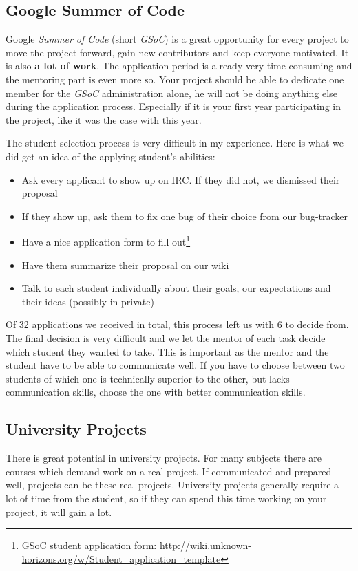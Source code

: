 \subsection{Google Summer of Code}
Google \textit{Summer of Code} (short \textit{GSoC}) is a great opportunity for every \OS{} project to move the project
forward, gain new contributors and keep everyone motivated. It is also \textbf{a lot of work}. The application period is
already very time consuming and the mentoring part is even more so. Your project should be able to dedicate one member
for the \textit{GSoC} administration alone, he will not be doing anything else during the application process. Especially
if it is your first year participating in the project, like it was the case with \UH{} this year.

The student selection process is very difficult in my experience. Here is what we did get an idea of the applying student's
abilities:
\begin{itemize}
    \item Ask every applicant to show up on IRC. If they did not, we dismissed their proposal
    \item If they show up, ask them to fix one bug of their choice from our bug-tracker
    \item Have a nice application form to fill out\footnote{\UH{} GSoC student application form:
        \url{http://wiki.unknown-horizons.org/w/Student_application_template}}
    \item Have them summarize their proposal on our wiki
    \item Talk to each student individually about their goals, our expectations and their ideas (possibly in private)
\end{itemize}

Of 32 applications we received in total, this process left us with 6 to decide from. The final decision is very difficult
and we let the mentor of each task decide which student they wanted to take. This is important as the mentor and the
student have to be able to
communicate well. If you have to choose between two students of which one is technically superior to the other, but
lacks communication skills, choose the one with better communication skills.

\subsection{University Projects}
There is great potential in university projects. For many subjects there are courses which demand work on a real
project. If communicated and prepared well, \OS{} projects can be these real projects. University projects generally
require a lot of time from the student, so if they can spend this time working on your project, it will gain a lot.

